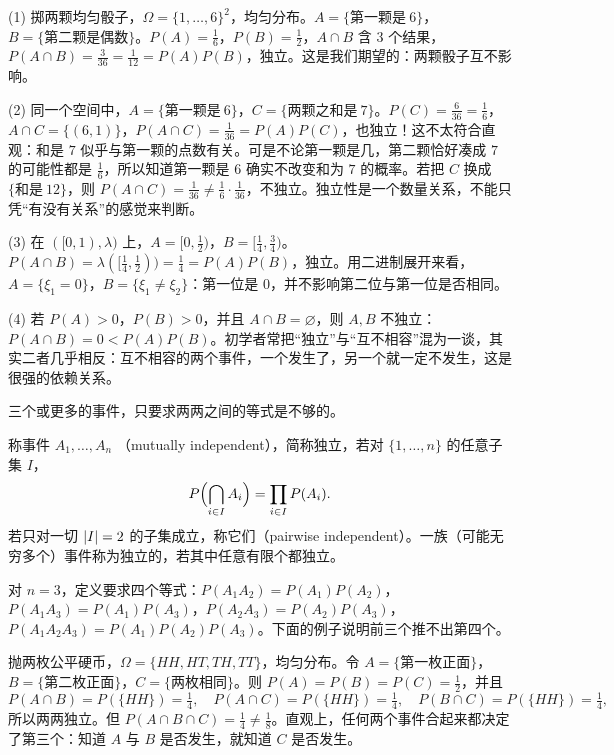 \begin{example}\label{ex:independence:two-events}
(1) 掷两颗均匀骰子，$\Omega=\{1,\dots,6\}^2$，均匀分布。$A=\{\text{第一颗是}\ 6\}$，$B=\{\text{第二颗是偶数}\}$。$P(A)=\frac16$，$P(B)=\frac12$，$A\cap B$ 含 $3$ 个结果，$P(A\cap B)=\frac3{36}=\frac1{12}=P(A)P(B)$，独立。这是我们期望的：两颗骰子互不影响。

(2) 同一个空间中，$A=\{\text{第一颗是}\ 6\}$，$C=\{\text{两颗之和是}\ 7\}$。$P(C)=\frac6{36}=\frac16$，$A\cap C=\{(6,1)\}$，$P(A\cap C)=\frac1{36}=P(A)P(C)$，也独立！这不太符合直观：和是 $7$ 似乎与第一颗的点数有关。可是不论第一颗是几，第二颗恰好凑成 $7$ 的可能性都是 $\frac16$，所以知道第一颗是 $6$ 确实不改变和为 $7$ 的概率。若把 $C$ 换成 $\{\text{和是}\ 12\}$，则 $P(A\cap C)=\frac1{36}\neq\frac16\cdot\frac1{36}$，不独立。独立性是一个数量关系，不能只凭“有没有关系”的感觉来判断。

(3) 在 $([0,1),\lambda)$ 上，$A=[0,\frac12)$，$B=[\frac14,\frac34)$。$P(A\cap B)=\lambda([\frac14,\frac12))=\frac14=P(A)P(B)$，独立。用二进制展开来看，$A=\{\xi_1=0\}$，$B=\{\xi_1\neq\xi_2\}$：第一位是 $0$，并不影响第二位与第一位是否相同。

(4) 若 $P(A)>0$，$P(B)>0$，并且 $A\cap B=\varnothing$，则 $A,B$ 不独立：$P(A\cap B)=0<P(A)P(B)$。初学者常把“独立”与“互不相容”混为一谈，其实二者几乎相反：互不相容的两个事件，一个发生了，另一个就一定不发生，这是很强的依赖关系。
\end{example}

三个或更多的事件，只要求两两之间的等式是不够的。

\begin{definition}[多个事件的独立性]\label{def:independence:events}
称事件 $A_1,\dots,A_n$ （mutually independent），简称独立，若对 $\{1,\dots,n\}$ 的任意子集 $I$，
\[
P\Bigl(\bigcap_{i\in I}A_i\Bigr)=\prod_{i\in I}P(A_i).
\]
若只对一切 $\lvert I\rvert=2$ 的子集成立，称它们（pairwise independent）。一族（可能无穷多个）事件称为独立的，若其中任意有限个都独立。
\end{definition}

对 $n=3$，定义要求四个等式：$P(A_1A_2)=P(A_1)P(A_2)$，$P(A_1A_3)=P(A_1)P(A_3)$，$P(A_2A_3)=P(A_2)P(A_3)$，$P(A_1A_2A_3)=P(A_1)P(A_2)P(A_3)$。下面的例子说明前三个推不出第四个。

\begin{example}[两两独立但不相互独立]\label{ex:independence:pairwise}
抛两枚公平硬币，$\Omega=\{HH,HT,TH,TT\}$，均匀分布。令 $A=\{\text{第一枚正面}\}$，$B=\{\text{第二枚正面}\}$，$C=\{\text{两枚相同}\}$。则 $P(A)=P(B)=P(C)=\frac12$，并且
\[
P(A\cap B)=P(\{HH\})=\tfrac14,\quad P(A\cap C)=P(\{HH\})=\tfrac14,\quad P(B\cap C)=P(\{HH\})=\tfrac14,
\]
所以两两独立。但 $P(A\cap B\cap C)=\frac14\neq\frac18$。直观上，任何两个事件合起来都决定了第三个：知道 $A$ 与 $B$ 是否发生，就知道 $C$ 是否发生。
\end{example}

